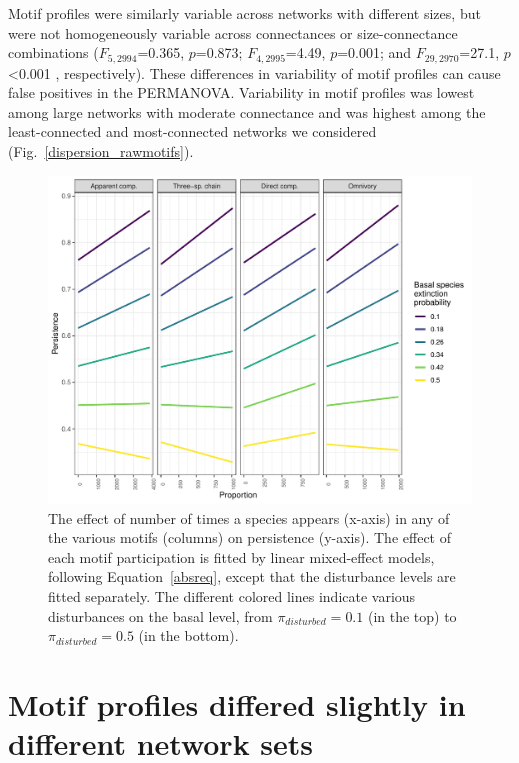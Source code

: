 \documentclass[12pt]{article}
\begin{document}
\begin{spacing}{2.0}
    
    Motif profiles were similarly variable across networks with different sizes, but were not homogeneously variable across connectances or size-connectance combinations ($F_{5,2994}$=0.365, $p$=0.873; $F_{4,2995}$=4.49, $p$=0.001; and $F_{29,2970}$=27.1, $p$\textless0.001 , respectively).
    These differences in variability of motif profiles can cause false positives in the PERMANOVA.
    Variability in motif profiles was lowest among large networks with moderate connectance and was highest among the least-connected and most-connected networks we considered (Fig.~\ref{dispersion_rawmotifs}).


    \begin{figure}[h!]
        \centering
        \includegraphics[width=\textwidth]{figures/absolute_lmer_allCS.pdf}
        \caption{The effect of number of times a species appears (x-axis) in any of the various motifs (columns) on persistence (y-axis). The effect of each motif participation is fitted by linear mixed-effect models, following Equation~\ref{absreq}, except that the disturbance levels are fitted separately. The different colored lines indicate various disturbances on the basal level, from $\pi_{disturbed} = 0.1$ (in the top) to $\pi_{disturbed} = 0.5$ (in the bottom).}
        \label{fig:abs_lmer_all}
    \end{figure}            


\clearpage


\section{Motif profiles differed slightly in different network sets}


\end{spacing}
\end{document}
